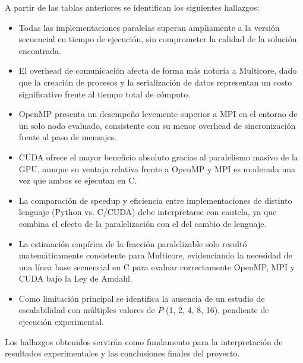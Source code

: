 A partir de las tablas anteriores se identifican los siguientes hallazgos:

\begin{itemize}
    \item Todas las implementaciones paralelas superan ampliamente a la versión secuencial en tiempo de ejecución, sin comprometer la calidad de la solución encontrada.
    \item El overhead de comunicación afecta de forma más notoria a Multicore, dado que la creación de procesos y la serialización de datos representan un costo significativo frente al tiempo total de cómputo.
    \item OpenMP presenta un desempeño levemente superior a MPI en el entorno de un solo nodo evaluado, consistente con su menor overhead de sincronización frente al paso de mensajes.
    \item CUDA ofrece el mayor beneficio absoluto gracias al paralelismo masivo de la GPU, aunque su ventaja relativa frente a OpenMP y MPI es moderada una vez que ambos se ejecutan en C.
    \item La comparación de speedup y eficiencia entre implementaciones de distinto lenguaje (Python vs. C/CUDA) debe interpretarse con cautela, ya que combina el efecto de la paralelización con el del cambio de lenguaje.
    \item La estimación empírica de la fracción paralelizable solo resultó matemáticamente consistente para Multicore, evidenciando la necesidad de una línea base secuencial en C para evaluar correctamente OpenMP, MPI y CUDA bajo la Ley de Amdahl.
    \item Como limitación principal se identifica la ausencia de un estudio de escalabilidad con múltiples valores de $P$ (1, 2, 4, 8, 16), pendiente de ejecución experimental.
\end{itemize}

Los hallazgos obtenidos servirán como fundamento para la interpretación de resultados experimentales y las conclusiones finales del proyecto.